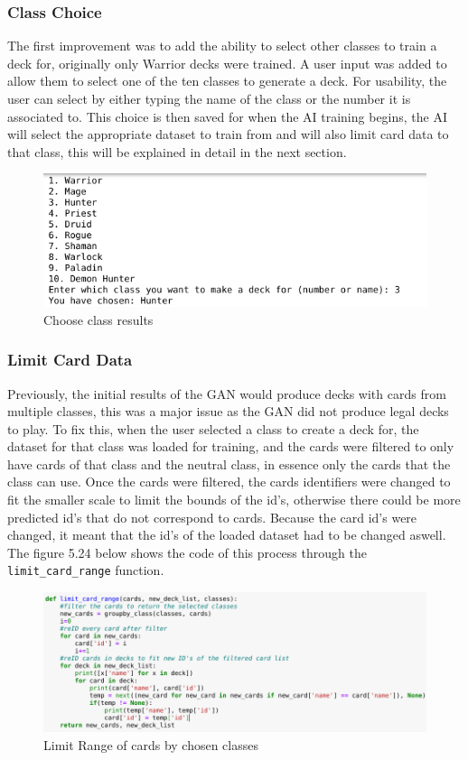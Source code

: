 \documentclass{report} %
\begin{document}
\subsubsection{Class Choice}
The first improvement was to add the ability to select other classes to train a deck for, originally only Warrior decks were trained. A user input was added to allow them to select one of the ten classes to generate a deck. For usability, the user can select by either typing the name of the class or the number it is associated to. This choice is then saved for when the AI training begins, the AI will select the appropriate dataset to train from and will also limit card data to that class, this will be explained in detail in the next section.

\begin{figure}[H]
\centering
\includegraphics[width=1\textwidth]{choice}
\caption{Choose class results \protect}
 \label{board}
\end{figure}

\subsubsection{Limit Card Data}
Previously, the initial results of the GAN would produce decks with cards from multiple classes, this was a major issue as the GAN did not produce legal decks to play. To fix this, when the user selected a class to create a deck for, the dataset for that class was loaded for training, and the cards were filtered to only have cards of that class and the neutral class, in essence only the cards that the class can use. Once the cards were filtered, the cards identifiers were changed to fit the smaller scale to limit the bounds of the id's, otherwise there could be more predicted id's that do not correspond to cards. Because the card id's were changed, it meant that the id's of the loaded dataset had to be changed aswell. The figure 5.24 below shows the code of this process through the \nolinkurl{limit_card_range} function. 

\begin{figure}[H]
\centering
\includegraphics[width=1.25\textwidth]{limitCardRange}
\caption{Limit Range of cards by chosen classes \protect}
 \label{board}
\end{figure}
\end{document}
